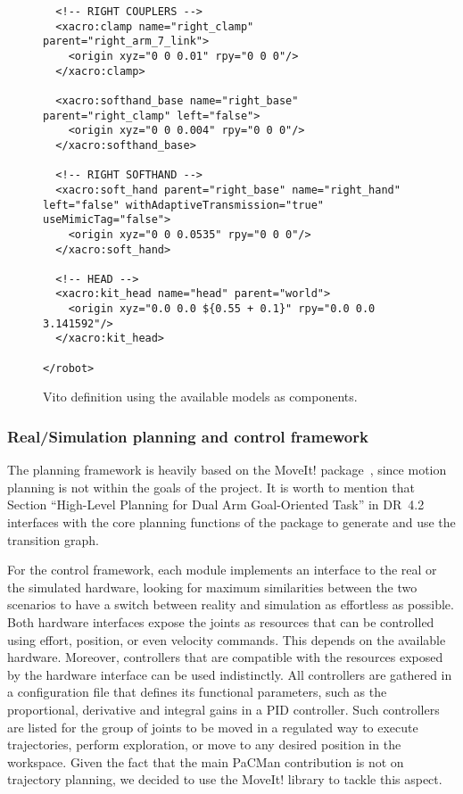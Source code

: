 \begin{figure}
\begin{verbatim}
  <!-- RIGHT COUPLERS -->
  <xacro:clamp name="right_clamp" parent="right_arm_7_link">
    <origin xyz="0 0 0.01" rpy="0 0 0"/>
  </xacro:clamp>

  <xacro:softhand_base name="right_base" parent="right_clamp" left="false">
    <origin xyz="0 0 0.004" rpy="0 0 0"/>
  </xacro:softhand_base>

  <!-- RIGHT SOFTHAND -->
  <xacro:soft_hand parent="right_base" name="right_hand" left="false" withAdaptiveTransmission="true" useMimicTag="false">
    <origin xyz="0 0 0.0535" rpy="0 0 0"/>
  </xacro:soft_hand>

  <!-- HEAD -->
  <xacro:kit_head name="head" parent="world">
    <origin xyz="0.0 0.0 ${0.55 + 0.1}" rpy="0.0 0.0 3.141592"/>
  </xacro:kit_head>

</robot>
\end{verbatim}
\caption{Vito definition using the available models as components.}
\label{fig:vito}
\end{figure}


\subsubsection{Real/Simulation planning and control framework}

The planning framework is heavily based on the MoveIt! package~\cite{webmoveit}, since motion planning is not within the goals of the project. It is worth to mention that Section ``High-Level Planning for Dual Arm Goal-Oriented Task'' in DR~4.2 interfaces with the core planning functions of the package to generate and use the transition graph.

For the control framework, each module implements an interface to the real or the simulated hardware, looking for maximum similarities between the two scenarios to have a switch between reality and simulation as effortless as possible. Both hardware interfaces expose the joints as resources that can be controlled using effort, position, or even velocity commands. This depends on the available hardware. Moreover, controllers that are compatible with the resources exposed by the hardware interface can be used indistinctly. All controllers are gathered in a configuration file that defines its functional parameters, such as the proportional, derivative and integral gains in a PID controller. Such controllers are listed for the group of joints to be moved in a regulated way to execute trajectories, perform exploration, or move to any desired position in the workspace. Given the fact that the main PaCMan contribution is not on trajectory planning, we decided to use the MoveIt! library to tackle this aspect.

